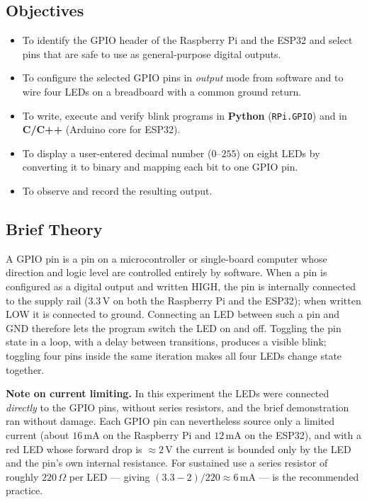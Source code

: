\documentclass[10pt,a4paper]{article}
\begin{document}
\subsection*{Objectives}
\begin{itemize}
  \item To identify the GPIO header of the Raspberry Pi and the ESP32 and select
        pins that are safe to use as general-purpose digital outputs.
  \item To configure the selected GPIO pins in \emph{output} mode from software and
        to wire four LEDs on a breadboard with a common ground return.
  \item To write, execute and verify blink programs in \textbf{Python}
        (\texttt{RPi.GPIO}) and in \textbf{C/C++} (Arduino core for ESP32).
  \item To display a user-entered decimal number ($0$--$255$) on eight LEDs by
        converting it to binary and mapping each bit to one GPIO pin.
  \item To observe and record the resulting output.
\end{itemize}

\subsection*{Brief Theory}
A GPIO pin is a pin on a microcontroller or single-board computer whose direction
and logic level are controlled entirely by software. When a pin is configured as a
digital output and written HIGH, the pin is internally connected to the supply rail
($3.3\,\mathrm{V}$ on both the Raspberry Pi and the ESP32); when written LOW it is
connected to ground. Connecting an LED between such a pin and GND therefore lets the
program switch the LED on and off.
Toggling the pin state in a loop, with a delay between transitions, produces a
visible blink; toggling four pins inside the same iteration makes all four LEDs
change state together.

\begin{notebox}
\textbf{Note on current limiting.} In this experiment the LEDs were connected
\emph{directly} to the GPIO pins, without series resistors, and the brief
demonstration ran without damage. Each GPIO pin can nevertheless source only a
limited current (about $16\,\mathrm{mA}$ on the Raspberry Pi and $12\,\mathrm{mA}$ on
the ESP32), and with a red LED whose forward drop is $\approx 2\,\mathrm{V}$ the
current is bounded only by the LED and the pin's own internal resistance. For
sustained use a series resistor of roughly $220\,\Omega$ per LED --- giving
$(3.3-2)/220 \approx 6\,\mathrm{mA}$ --- is the recommended practice.
\end{notebox}
\end{document}
